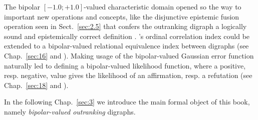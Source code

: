 The bipolar $[-1.0;+1.0]$-valued characteristic domain opened so the way to important new operations and concepts, like the disjunctive epistemic fusion operation seen in Sect.~\vref{sec:2.5} that confers the outranking digraph a logically sound and epistemically correct definition \citep{BIS-2013}. \Kendall 's ordinal correlation index could be extended to a bipolar-valued relational equivalence index between digraphs (see Chap.~\ref{sec:16} and \citealp{BIS-2012a}). Making usage of the bipolar-valued Gaussian error function naturally led to defining a bipolar-valued likelihood function, where a positive, resp. negative, value gives the likelihood of an affirmation, resp. a refutation (see Chap.~\ref{sec:18} and \citealp{BIS-2014}).      

\vspace{\baselineskip}
In the following Chap.~\ref{sec:3}  we introduce the main formal object of this book, namely \emph{bipolar-valued outranking} digraphs.


%
%

